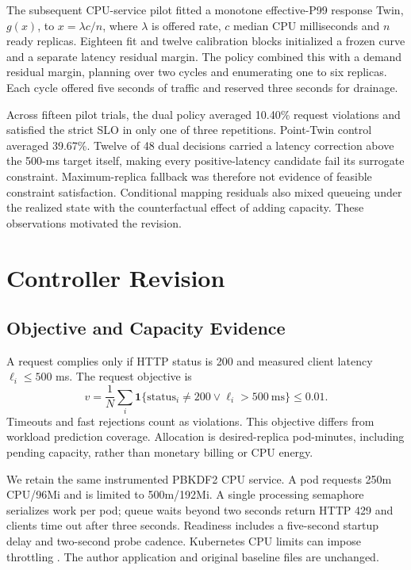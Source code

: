 \documentclass[10pt,twocolumn,a4paper]{article}
\begin{document}
The subsequent CPU-service pilot fitted a monotone effective-P99 response Twin, $g(x)$, to $x=\lambda c/n$, where $\lambda$ is offered rate, $c$ median CPU milliseconds and $n$ ready replicas. Eighteen fit and twelve calibration blocks initialized a frozen curve and a separate latency residual margin. The policy combined this with a demand residual margin, planning over two cycles and enumerating one to six replicas. Each cycle offered five seconds of traffic and reserved three seconds for drainage.

Across fifteen pilot trials, the dual policy averaged 10.40\% request violations and satisfied the strict SLO in only one of three repetitions. Point-Twin control averaged 39.67\%. Twelve of 48 dual decisions carried a latency correction above the 500-ms target itself, making every positive-latency candidate fail its surrogate constraint. Maximum-replica fallback was therefore not evidence of feasible constraint satisfaction. Conditional mapping residuals also mixed queueing under the realized state with the counterfactual effect of adding capacity. These observations motivated the revision.

\section{Controller Revision}
\subsection{Objective and Capacity Evidence}
A request complies only if HTTP status is 200 and measured client latency $\ell_i\leq500$ ms. The request objective is
\begin{equation}v=\frac{1}{N}\sum_i\mathbf1\{\mathrm{status}_i\ne200\lor\ell_i>500\mathrm{\ ms}\}\leq0.01.\label{eq:slo}\end{equation}
Timeouts and fast rejections count as violations. This objective differs from workload prediction coverage. Allocation is desired-replica pod-minutes, including pending capacity, rather than monetary billing or CPU energy.

We retain the same instrumented PBKDF2 CPU service. A pod requests 250m CPU/96Mi and is limited to 500m/192Mi. A single processing semaphore serializes work per pod; queue waits beyond two seconds return HTTP 429 and clients time out after three seconds. Readiness includes a five-second startup delay and two-second probe cadence. Kubernetes CPU limits can impose throttling \cite{j01,j12}. The author application and original baseline files are unchanged.
\end{document}
